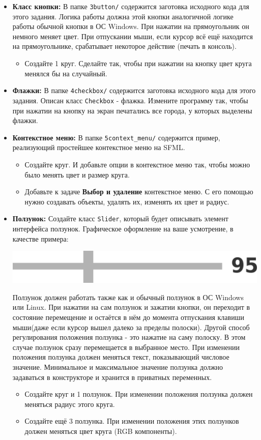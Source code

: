 \documentclass{article}
\begin{document}
\begin{itemize}
\item \textbf{Класс кнопки:} В папке \texttt{3button/} содержится заготовка исходного кода для этого задания.  Логика работы должна этой кнопки аналогичной логике работы обычной кнопки в ОС Windows. При нажатии на прямоугольник он немного меняет цвет. При отпускании мыши, если курсор всё ещё находится на прямоугольнике, срабатывает некоторое действие (печать в консоль).
	\begin{itemize}
	\item Создайте 1 круг. Сделайте так, чтобы при нажатии на кнопку цвет круга менялся бы на случайный.
	\end{itemize}
	
\item \textbf{Флажки:} В папке \texttt{4checkbox/} содержится заготовка исходного кода для этого задания. Описан класс \texttt{Checkbox} - флажка. Измените программу так, чтобы при нажатии на кнопку на экран печатались все города, у которых выделены флажки.

\item \textbf{Контекстное меню:} В папке \texttt{5context\_menu/} содержится пример, реализующий простейшее контекстное меню на SFML.
\begin{itemize}
\item Создайте круг. И добавьте опции в контекстное меню так, чтобы можно было менять цвет и размер круга.
\item Добавьте к задаче \textbf{Выбор и удаление} контекстное меню. С его помощью нужно создавать объекты, удалять их, изменять их цвет и радиус.
\end{itemize}
\newpage
\item \textbf{Ползунок:} Создайте класс \texttt{Slider}, который будет описывать элемент интерфейса ползунок. Графическое оформление на ваше усмотрение, в качестве примера:
\begin{center}
\includegraphics[scale=0.6]{../images/slider.png}
\end{center}
Ползунок должен работать также как и обычный ползунок в ОС Windows или Linux. При нажатии на сам ползунок и зажатии кнопки, он переходит в состояние перемещение и остаётся в нём до момента отпускания клавиши мыши(даже если курсор вышел далеко за пределы полоски). Другой способ регулирования положения ползунка - это нажатие на саму полоску. В этом случае ползунок сразу перемещается в выбранное место. При изменении положения ползунка должен меняться текст, показывающий числовое значение. Минимальное и максимальное значение ползунка должно задаваться в конструкторе и хранится в приватных переменных.
\begin{itemize}
\item Создайте круг и 1 ползунок. При изменении положения ползунка должен меняться радиус этого круга.
\item Создайте ещё 3 ползунка. При изменении положения этих ползунков должен меняться цвет круга (RGB компоненты).
\end{itemize}
\end{itemize}
\end{document}
